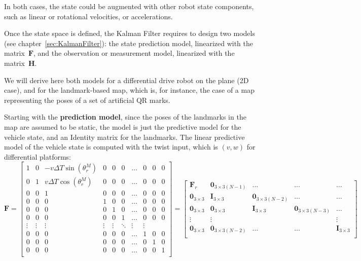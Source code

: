 In both cases, the state could be augmented with other robot state components, such as linear or rotational velocities, or accelerations.

Once the state space is defined, the Kalman Filter requires to design two models (see chapter~\ref{sec:KalmanFilter}): the state prediction model, linearized with the matrix~$\mathbf{F}$, and the observation or measurement model, linearized with the matrix~$\mathbf{H}$. 

We will derive here both models for a differential drive robot on the plane (2D case), and for the landmark-based map, which is, for instance, the case of a map representing the poses of a set of artificial QR marks. 

Starting with the \textbf{prediction model}, since the poses of the landmarks in the map are assumed to be static, the model is just the predictive model for the vehicle state, and an Identity matrix for the landmarks. The linear predictive model of the vehicle state is computed with the twist input, which is $(v,w)$ for differential platforms:
\footnotesize
\begin{equation}
\mathbf{F} = 
\left[
 \begin{array}{cccccccccc}
 1 & 0 & -v\Delta T \sin(\theta^M_r) & 0 & 0 & 0 & \dots & 0 & 0 & 0 \\ 
 0 & 1 & v\Delta T \cos(\theta^M_r) & 0 & 0 & 0 & \dots & 0 & 0 & 0 \\
 0 & 0 & 1 & 0 & 0 & 0 & \dots & 0 & 0 & 0 \\ 
 0 & 0 & 0 & 1 & 0 & 0 & \dots & 0 & 0 & 0 \\ 
 0 & 0 & 0 & 0 & 1 & 0 & \dots & 0 & 0 & 0 \\
 0 & 0 & 0 & 0 & 0 & 1 & \dots & 0 & 0 & 0 \\
 \vdots & \vdots & \vdots & \vdots & \vdots & \ddots & \vdots & \vdots \\
 0 & 0 & 0 & 0 & 0 & 0 & \dots & 1 & 0 & 0\\
 0 & 0 & 0 & 0 & 0 & 0 & \dots & 0 & 1 & 0\\
 0 & 0 & 0 & 0 & 0 & 0 & \dots & 0 & 0 & 1\\
 \end{array}
\right] = 
\left[
 \begin{array}{ccccc}
 \mathbf{F}_r & \mathbf{0}_{3\times 3(N-1)} & \dots & \dots & \dots\\
 \mathbf{0}_{3\times 3} & \mathbf{I}_{3\times 3} & \mathbf{0}_{3\times3(N-2)} & \dots & \dots\\
 \mathbf{0}_{3\times 3} & \mathbf{0}_{3\times 3} & \mathbf{I}_{3\times 3} & \mathbf{0}_{3\times3(N-3)} & \dots\\
 \vdots & \vdots & & & \vdots \\
 \mathbf{0}_{3\times 3} & \mathbf{0}_{3\times 3(N-2)} & \dots & \dots & \mathbf{I}_{3\times 3} \\
 \end{array}
\right]
\end{equation}
\normalsize


